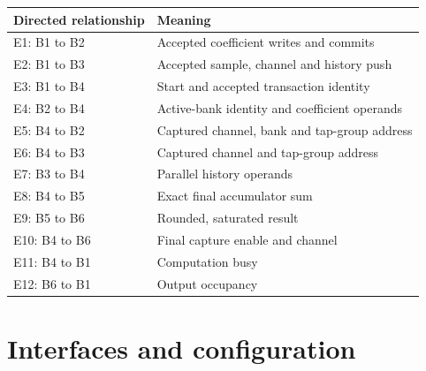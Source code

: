 \documentclass[11pt,a4paper]{article}
\begin{document}
{\small\renewcommand{\arraystretch}{1.18}\begin{longtable}{@{}L{0.24\textwidth}|L{0.7\textwidth}@{}}\toprule

\textbf{Directed relationship} & \textbf{Meaning}\\\midrule\endhead

E1: B1 to B2 & Accepted coefficient writes and commits\\[2pt]\hline

E2: B1 to B3 & Accepted sample,\allowbreak{} channel and history push\\[2pt]\hline

E3: B1 to B4 & Start and accepted transaction identity\\[2pt]\hline

E4: B2 to B4 & Active-bank identity and coefficient operands\\[2pt]\hline

E5: B4 to B2 & Captured channel,\allowbreak{} bank and tap-group address\\[2pt]\hline

E6: B4 to B3 & Captured channel and tap-group address\\[2pt]\hline

E7: B3 to B4 & Parallel history operands\\[2pt]\hline

E8: B4 to B5 & Exact final accumulator sum\\[2pt]\hline

E9: B5 to B6 & Rounded,\allowbreak{} saturated result\\[2pt]\hline

E10: B4 to B6 & Final capture enable and channel\\[2pt]\hline

E11: B4 to B1 & Computation busy\\[2pt]\hline

E12: B6 to B1 & Output occupancy\\[2pt]\hline

\bottomrule\end{longtable}}

\section{Interfaces and configuration}
\end{document}
